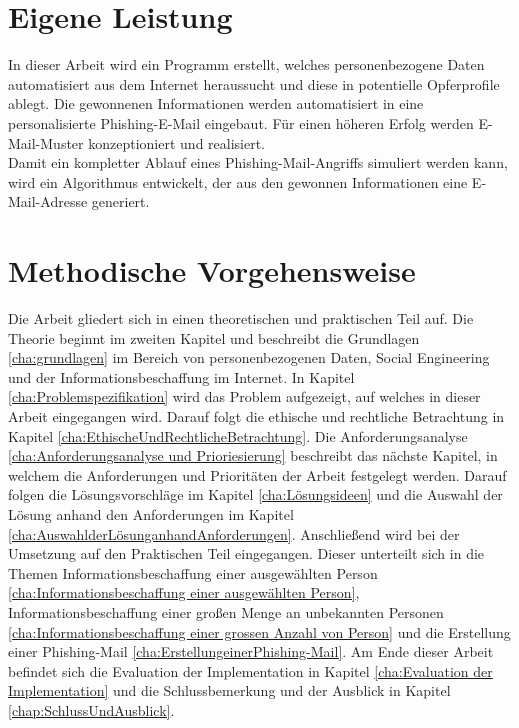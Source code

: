 

 	
\section{Eigene Leistung}
\label {sec:Eigene Leistung} 
In dieser Arbeit wird ein Programm erstellt, welches personenbezogene Daten automatisiert aus dem Internet heraussucht und diese in potentielle Opferprofile ablegt. Die gewonnenen Informationen werden  automatisiert in eine personalisierte Phishing-E-Mail eingebaut. Für einen höheren Erfolg werden E-Mail-Muster konzeptioniert und realisiert.\\
Damit ein kompletter Ablauf eines Phishing-Mail-Angriffs simuliert werden kann, wird ein Algorithmus entwickelt, der aus den gewonnen Informationen eine E-Mail-Adresse generiert.

\section{Methodische Vorgehensweise}
\label {sec:Aufbau der Arbeit} 
Die Arbeit gliedert sich in einen theoretischen und praktischen Teil auf. Die Theorie beginnt im zweiten Kapitel und beschreibt die Grundlagen \ref{cha:grundlagen} im Bereich von personenbezogenen Daten, Social Engineering und der Informationsbeschaffung im Internet. In Kapitel \ref{cha:Problemspezifikation} wird das Problem aufgezeigt, auf welches in dieser Arbeit eingegangen wird. Darauf folgt die ethische und rechtliche Betrachtung in Kapitel \ref{cha:EthischeUndRechtlicheBetrachtung}. Die Anforderungsanalyse \ref{cha:Anforderungsanalyse und Prioriesierung} beschreibt das nächste Kapitel, in welchem die Anforderungen und Prioritäten der Arbeit festgelegt werden. Darauf folgen die Lösungsvorschläge im Kapitel \ref{cha:Lösungsideen} und die Auswahl der Lösung anhand den Anforderungen im Kapitel \ref{cha:AuswahlderLösunganhandAnforderungen}. Anschließend wird bei der Umsetzung auf den Praktischen Teil eingegangen. Dieser unterteilt sich in die Themen Informationsbeschaffung einer ausgewählten Person \ref{cha:Informationsbeschaffung einer ausgewählten Person}, Informationsbeschaffung einer großen Menge an unbekannten Personen \ref{cha:Informationsbeschaffung einer grossen Anzahl von Person} und die Erstellung einer Phishing-Mail \ref{cha:ErstellungeinerPhishing-Mail}. Am Ende dieser Arbeit befindet sich die Evaluation der Implementation in Kapitel \ref{cha:Evaluation der Implementation} und die Schlussbemerkung und der Ausblick in Kapitel \ref{chap:SchlussUndAusblick}.






